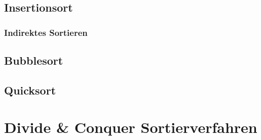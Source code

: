 \documentclass[12pt,a4paper]{article}
\begin{document}
\subsection{Insertionsort}

\subsubsection{Indirektes Sortieren}

\subsection{Bubblesort}

\subsection{Quicksort}

\section{Divide \& Conquer Sortierverfahren}
\end{document}
